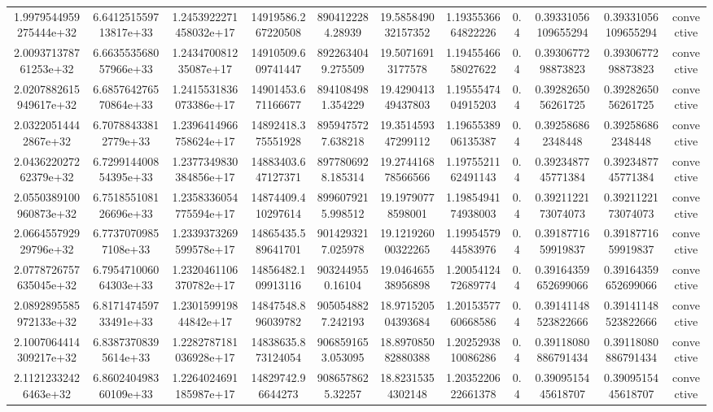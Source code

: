 \begin{table}
\begin{tabular}{ccccccccccc}
1.9979544959275444e+32 & 6.641251559713817e+33 & 1.2453922271458032e+17 & 14919586.267220508 & 8904122284.28939 & 19.585849032157352 & 1.1935536664822226 & 0.4 & 0.39331056109655294 & 0.39331056109655294 & convective \\
2.009371378761253e+32 & 6.663553568057966e+33 & 1.243470081235087e+17 & 14910509.609741447 & 8922634049.275509 & 19.50716913177578 & 1.1945546658027622 & 0.4 & 0.3930677298873823 & 0.3930677298873823 & convective \\
2.0207882615949617e+32 & 6.685764276570864e+33 & 1.2415531836073386e+17 & 14901453.671166677 & 8941084981.354229 & 19.429041349437803 & 1.1955547404915203 & 0.4 & 0.3928265056261725 & 0.3928265056261725 & convective \\
2.03220514442867e+32 & 6.70788433812779e+33 & 1.2396414966758624e+17 & 14892418.375551928 & 8959475727.638218 & 19.351459347299112 & 1.1965538906135387 & 0.4 & 0.392586862348448 & 0.392586862348448 & convective \\
2.043622027262379e+32 & 6.729914400854395e+33 & 1.2377349830384856e+17 & 14883403.647127371 & 8977806928.185314 & 19.274416878566566 & 1.1975521162491143 & 0.4 & 0.3923487745771384 & 0.3923487745771384 & convective \\
2.0550389100960873e+32 & 6.751855108126696e+33 & 1.2358336054775594e+17 & 14874409.410297614 & 8996079215.998512 & 19.19790778598001 & 1.1985494174938003 & 0.4 & 0.3921122173074073 & 0.3921122173074073 & convective \\
2.066455792929796e+32 & 6.77370709857108e+33 & 1.2339373269599578e+17 & 14865435.589641701 & 9014293217.025978 & 19.121926000322265 & 1.1995457944583976 & 0.4 & 0.3918771659919837 & 0.3918771659919837 & convective \\
2.0778726757635045e+32 & 6.795471006064303e+33 & 1.2320461106370782e+17 & 14856482.109913116 & 9032449550.16104 & 19.046465538956898 & 1.2005412472689774 & 0.4 & 0.39164359652699066 & 0.39164359652699066 & convective \\
2.0892895585972133e+32 & 6.817147459733491e+33 & 1.230159919844842e+17 & 14847548.896039782 & 9050548827.242193 & 18.971520504393684 & 1.2015357760668586 & 0.4 & 0.39141148523822666 & 0.39141148523822666 & convective \\
2.1007064414309217e+32 & 6.83873708395614e+33 & 1.2282787181036928e+17 & 14838635.873124054 & 9068591653.053095 & 18.897085082880388 & 1.2025293810086286 & 0.4 & 0.39118080886791434 & 0.39118080886791434 & convective \\
2.11212332426463e+32 & 6.860240498360109e+33 & 1.2264024691185987e+17 & 14829742.96644273 & 9086578625.32257 & 18.82315354302148 & 1.2035220622661378 & 0.4 & 0.3909515445618707 & 0.3909515445618707 & convective \\

\end{tabular}
\end{table}
